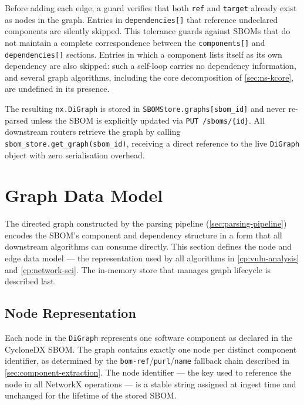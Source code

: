 Before adding each edge, a guard verifies that both \texttt{ref} and \texttt{target} already exist as nodes in the graph. Entries in \texttt{dependencies[]} that reference undeclared components are silently skipped. This tolerance guards against SBOMs that do not maintain a complete correspondence between the \texttt{components[]} and \texttt{dependencies[]} sections. Entries in which a component lists itself as its own dependency are also skipped: such a self-loop carries no dependency information, and several graph algorithms, including the core decomposition of \autoref{sec:ns-kcore}, are undefined in its presence.

The resulting \texttt{nx.DiGraph} is stored in \texttt{SBOMStore.graphs[sbom\_id]} and never re-parsed unless the SBOM is explicitly updated via \texttt{PUT /sboms/\{id\}}. All downstream routers retrieve the graph by calling \texttt{sbom\_store.get\_graph(sbom\_id)}, receiving a direct reference to the live \texttt{DiGraph} object with zero serialisation overhead.


\section{Graph Data Model}
\label{sec:graph-data-model}

The directed graph constructed by the parsing pipeline (\autoref{sec:parsing-pipeline}) encodes the SBOM's component and dependency structure in a form that all downstream algorithms can consume directly. This section defines the node and edge data model --- the representation used by all algorithms in \autoref{cp:vuln-analysis} and \autoref{cp:network-sci}. The in-memory store that manages graph lifecycle is described last.


\subsection{Node Representation}
\label{sec:node-representation}

Each node in the \texttt{DiGraph} represents one software component as declared in the CycloneDX SBOM. The graph contains exactly one node per distinct component identifier, as determined by the \texttt{bom-ref}/\texttt{purl}/\texttt{name} fallback chain described in \autoref{sec:component-extraction}. The node identifier --- the key used to reference the node in all NetworkX operations --- is a stable string assigned at ingest time and unchanged for the lifetime of the stored SBOM.

